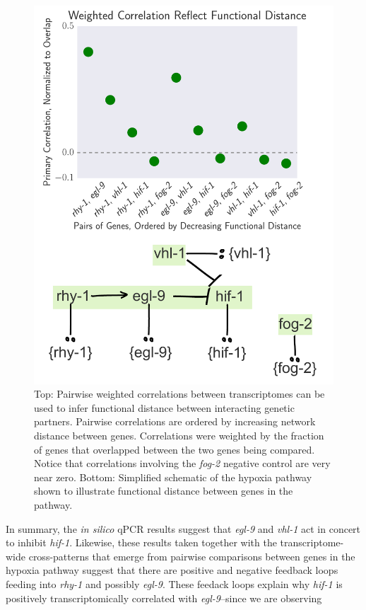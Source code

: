 \documentclass[9pt,twocolumn,twoside]{pnas-new}
\newcommand{\egl}{\emph{egl-9}}
\newcommand{\rhy}{\emph{rhy-1}}
\newcommand{\vhl}{\emph{vhl-1}}
\newcommand{\hif}{\emph{hif-1}}
\newcommand{\fog}{\emph{fog-2}}
\begin{document}
\begin{figure}[tbhp]
\centering
\includegraphics[width=.72\linewidth]{figs/functional_distance.pdf}
\caption{Top: Pairwise weighted correlations between transcriptomes can be used to infer functional distance between interacting genetic partners. Pairwise correlations are ordered by increasing network distance between genes. Correlations were weighted by the fraction of genes that overlapped between the two genes being compared. Notice that correlations involving the \fog{} negative control are very near zero. Bottom: Simplified schematic of the hypoxia pathway shown to illustrate functional distance between genes in the pathway.}
\label{fig:decorrelation}
\end{figure}

In summary, the \emph{in silico} qPCR results suggest that \egl{} and \vhl{} act in concert to inhibit \hif{}. Likewise, these results taken together with the transcriptome-wide cross-patterns that emerge from pairwise comparisons between genes in the hypoxia pathway suggest that there are positive and negative feedback loops feeding into \rhy{} and possibly \egl{}. These feedack loops explain why \hif{} is positively transcriptomically correlated with \egl{}--since we are observing
\end{document}
